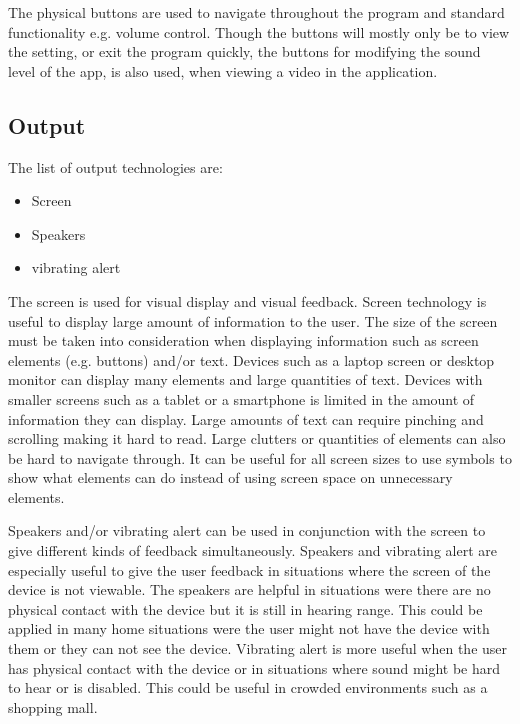 
The physical buttons are used to navigate throughout the program and standard functionality e.g. volume control. Though the buttons will mostly only be to view the setting, or exit the program quickly, the buttons for modifying the sound level of the app, is also used, when viewing a video in the application.

\subsection{Output}
The list of output technologies are:

\begin{itemize}
    \item Screen
    \item Speakers
    \item vibrating alert
\end{itemize}

The screen is used for visual display and visual feedback. Screen technology is useful to display large amount of information to the user. The size of the screen must be taken into consideration when displaying information such as screen elements (e.g. buttons) and/or text. Devices such as a laptop screen or desktop monitor can display many elements and large quantities of text. Devices with smaller screens such as a tablet or a smartphone is limited in the amount of information they can display. Large amounts of text can require pinching and scrolling making it hard to read. Large clutters or quantities of elements can also be hard to navigate through. It can be useful for all screen sizes to use symbols to show what elements can do instead of using screen space on unnecessary elements.            

Speakers and/or vibrating alert can be used in conjunction with the screen to give different kinds of feedback simultaneously. Speakers and vibrating alert are especially useful to give the user feedback in situations where the screen of the device is not viewable. The speakers are helpful in situations were there are no physical contact with the device but it is still in hearing range. This could be applied in many home situations were the user might not have the device with them or they can not see the device. Vibrating alert is more useful when the user has physical contact with the device or in situations where sound might be hard to hear or is disabled. This could be useful in crowded environments such as a shopping mall.     

